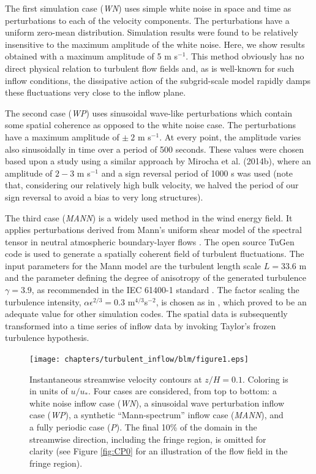 	The first simulation case (\emph{WN}) uses simple white noise in space and time as perturbations to each of the velocity components.  The perturbations have a uniform zero-mean distribution. Simulation results were found to be relatively insensitive to the maximum amplitude of the white noise. Here, we show results obtained with a maximum amplitude of 5 m s$^{-1}$. This method obviously has no direct physical relation to turbulent flow fields and, as is well-known for such inflow conditions, the dissipative action of the subgrid-scale model rapidly damps these fluctuations very close to the inflow plane. 
	
	The second case (\emph{WP}) uses sinusoidal wave-like perturbations which contain some spatial coherence as opposed to the white noise case. The perturbations have a maximum amplitude of $\pm~2$ m s$^{-1}$. At every point, the amplitude varies also sinusoidally in time over a period of 500 seconds. These values were chosen based upon a study using a similar approach by Mirocha et al. (2014b), where an amplitude of $2-3$ m s$^{-1}$ and a sign reversal period of 1000 s was used (note that, considering our relatively high bulk velocity, we halved the period of our sign reversal to avoid a bias to very long structures). 
	
	The third case (\emph{MANN}) is a widely used method in the wind energy field. It applies perturbations derived from Mann's uniform shear
	model of the spectral tensor in neutral atmospheric boundary-layer flows \citep{mann1998wind}. The open source TuGen code
	\citep{gilling2009tugen} is used to generate a spatially coherent field of turbulent fluctuations. The input parameters for the Mann model are
	the turbulent length scale $L = 33.6$ m and the parameter defining the degree of anisotropy of the generated turbulence $\gamma = 3.9$, as
	recommended in the IEC 61400-1 standard \citep{IEC61400-1}. The factor scaling the turbulence intensity, $\alpha \epsilon^{2/3} = 0.3$ m$^{4/3}$s$^{-2}$, is chosen as in \cite{van2014cfd}, which proved to be an adequate value for other simulation codes. The spatial data is subsequently transformed into a time series of inflow data by invoking Taylor's frozen turbulence hypothesis.
	
	\begin{figure}[ht!]
		\centering
		\texttt{[image: chapters/turbulent\_inflow/blm/figure1.eps]}
		\caption{Instantaneous streamwise velocity contours at $z/H = 0.1$. Coloring is in units of $u/u_*$.  Four cases are considered, from top to bottom: a white noise inflow case (\emph{WN}), a sinusoidal wave perturbation inflow case (\emph{WP}), a synthetic ``Mann-spectrum'' inflow case (\emph{MANN}), and a fully periodic case (\emph{P}). The final 10\% of the domain in the streamwise direction, including the fringe region, is omitted for clarity (see Figure \ref{fig:CP0} for an illustration of the flow field in the fringe region).}
		\label{fig:snapshots_top}
	\end{figure}
	
